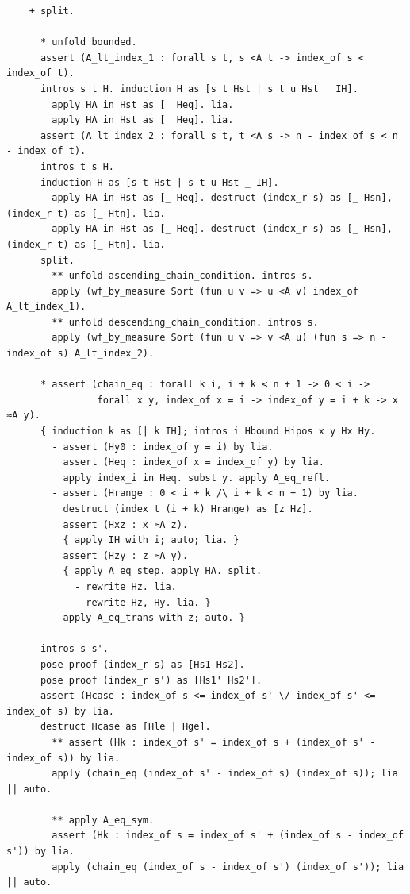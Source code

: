 \begin{latin}
\begin{verbatim}
    + split. 

      * unfold bounded. 
      assert (A_lt_index_1 : forall s t, s <A t -> index_of s < index_of t).
      intros s t H. induction H as [s t Hst | s t u Hst _ IH].
        apply HA in Hst as [_ Heq]. lia.
        apply HA in Hst as [_ Heq]. lia.
      assert (A_lt_index_2 : forall s t, t <A s -> n - index_of s < n - index_of t).
      intros t s H. 
      induction H as [s t Hst | s t u Hst _ IH].
        apply HA in Hst as [_ Heq]. destruct (index_r s) as [_ Hsn], (index_r t) as [_ Htn]. lia.
        apply HA in Hst as [_ Heq]. destruct (index_r s) as [_ Hsn], (index_r t) as [_ Htn]. lia.
      split. 
        ** unfold ascending_chain_condition. intros s.
        apply (wf_by_measure Sort (fun u v => u <A v) index_of A_lt_index_1).
        ** unfold descending_chain_condition. intros s.
        apply (wf_by_measure Sort (fun u v => v <A u) (fun s => n - index_of s) A_lt_index_2).
      
      * assert (chain_eq : forall k i, i + k < n + 1 -> 0 < i ->
                forall x y, index_of x = i -> index_of y = i + k -> x ≈A y).
      { induction k as [| k IH]; intros i Hbound Hipos x y Hx Hy.
        - assert (Hy0 : index_of y = i) by lia.
          assert (Heq : index_of x = index_of y) by lia.
          apply index_i in Heq. subst y. apply A_eq_refl.
        - assert (Hrange : 0 < i + k /\ i + k < n + 1) by lia.
          destruct (index_t (i + k) Hrange) as [z Hz].
          assert (Hxz : x ≈A z).
          { apply IH with i; auto; lia. }
          assert (Hzy : z ≈A y).
          { apply A_eq_step. apply HA. split.
            - rewrite Hz. lia.
            - rewrite Hz, Hy. lia. }
          apply A_eq_trans with z; auto. }
      
      intros s s'.
      pose proof (index_r s) as [Hs1 Hs2].
      pose proof (index_r s') as [Hs1' Hs2'].
      assert (Hcase : index_of s <= index_of s' \/ index_of s' <= index_of s) by lia.
      destruct Hcase as [Hle | Hge].
        ** assert (Hk : index_of s' = index_of s + (index_of s' - index_of s)) by lia.
        apply (chain_eq (index_of s' - index_of s) (index_of s)); lia || auto.
        
        ** apply A_eq_sym.
        assert (Hk : index_of s = index_of s' + (index_of s - index_of s')) by lia.
        apply (chain_eq (index_of s - index_of s') (index_of s')); lia || auto.
  

\end{verbatim}
\end{latin}
